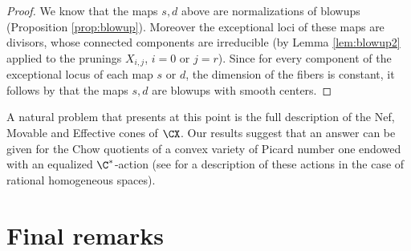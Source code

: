 \documentclass[reqno]{amsproc}
\theoremstyle{definition}
\newtheorem{remark}[theorem]{Remark}
\begin{document}
\begin{proof}
We know that the maps $s,d$ above are normalizations of blowups (Proposition \ref{prop:blowup}). Moreover the exceptional loci of these maps are divisors, whose connected components are irreducible (by Lemma \ref{lem:blowup2} applied to the prunings $X_{i,j}$, $i=0$ or $j=r$). Since for every component of the exceptional locus of each map $s$ or $d$, the dimension of the fibers is constant, it follows by \cite[Corollary~4.11]{AWDuke} that the maps $s,d$ are blowups with smooth centers.
\end{proof}
%

A natural problem that presents at this point is the full description of the Nef, Movable and Effective cones of $\CX$. Our results suggest that an answer can be given for the Chow quotients of a convex variety of Picard number one endowed with an equalized $\C^*$-action (see \cite{WORS3} for a description of these actions in the case of rational homogeneous spaces). 



\section{Final remarks}\label{sec:final}
\end{document}
